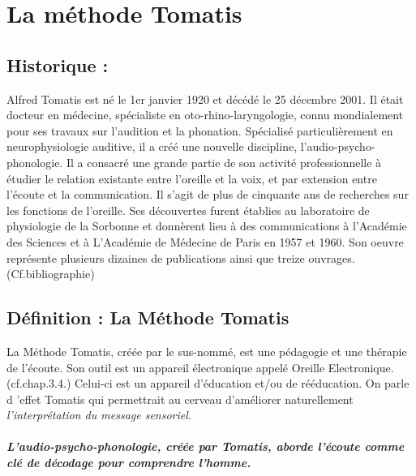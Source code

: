 \chapter{La méthode Tomatis}

\section{Historique :}

Alfred Tomatis est né le 1er janvier 1920 et décédé le 25 décembre
2001. Il était docteur en médecine, spécialiste en oto-rhino-laryngologie,
connu mondialement pour ses travaux sur l'audition et la phonation.
Spécialisé particulièrement en neurophysiologie auditive, il a créé
une nouvelle discipline, l'audio-psycho-phonologie. Il a consacré
une grande partie de son activité professionnelle à étudier le relation
existante entre l'oreille et la voix, et par extension entre l'écoute
et la communication. Il s'agit de plus de cinquante ans de recherches
sur les fonctions de l'oreille. Ses découvertes furent établies au
laboratoire de physiologie de la Sorbonne et donnèrent lieu à des
communications à l'Académie des Sciences et à L'Académie de Médecine
de Paris en 1957 et 1960. Son oeuvre représente plusieurs dizaines
de publications ainsi que treize ouvrages. (Cf.bibliographie)

\section{Définition : La Méthode Tomatis}

La Méthode Tomatis, créée par le sus-nommé, est une pédagogie et une
thérapie de l'écoute. Son outil est un appareil électronique appelé
Oreille Electronique. (cf.chap.3.4.) Celui-ci est un appareil d'éducation
et/ou de rééducation. On parle d 'effet Tomatis qui permettrait au
cerveau d'améliorer naturellement \emph{l'interprétation du message
sensoriel.}

\paragraph{L'audio-psycho-phonologie, créée par Tomatis, aborde l'écoute comme
clé de décodage pour comprendre l'homme.}

